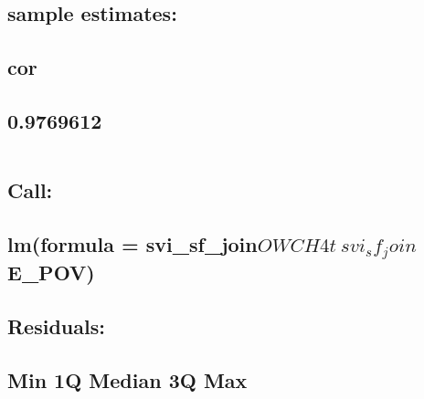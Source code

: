 \documentclass[
  12pt,
]{article}
\begin{document}
\hypertarget{sample-estimates-8}{%
\subsection{sample estimates:}\label{sample-estimates-8}}

\hypertarget{cor-8}{%
\subsection{cor}\label{cor-8}}

\hypertarget{section-83}{%
\subsection{0.9769612}\label{section-83}}

\begin{verbatim}
\end{verbatim}

\hypertarget{section-84}{%
\subsection{}\label{section-84}}

\hypertarget{call-8}{%
\subsection{Call:}\label{call-8}}

\hypertarget{lmformula-svi_sf_joinowch4t-svi_sf_joine_pov}{%
\subsection{\texorpdfstring{lm(formula =
svi\_sf\_join\(OWCH4t ~ svi_sf_join\)E\_POV)}{lm(formula = svi\_sf\_joinOWCH4t \textasciitilde{} svi\_sf\_joinE\_POV)}}\label{lmformula-svi_sf_joinowch4t-svi_sf_joine_pov}}

\hypertarget{section-85}{%
\subsection{}\label{section-85}}

\hypertarget{residuals-8}{%
\subsection{Residuals:}\label{residuals-8}}

\hypertarget{min-1q-median-3q-max-8}{%
\subsection{Min 1Q Median 3Q Max}\label{min-1q-median-3q-max-8}}
\end{document}
